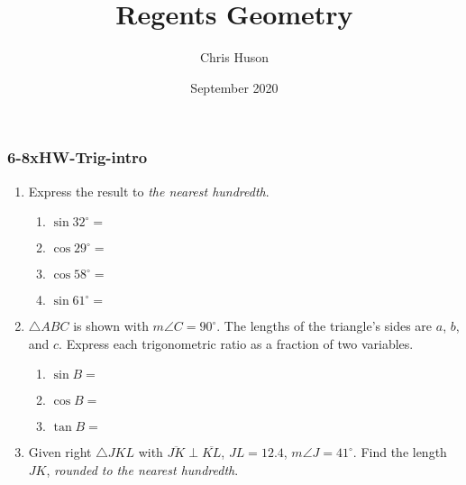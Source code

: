 \documentclass[12pt, twoside]{article}
\title{Regents Geometry}
\author{Chris Huson}
\date{September 2020}
\begin{document}
\subsubsection*{6-8xHW-Trig-intro}
\begin{enumerate}
\item Express the result to \emph{the nearest hundredth}.  \vspace{0.5cm}
    \begin{multicols}{2}
      \begin{enumerate}
        \item $\sin 32^\circ = $ \vspace{0.5cm}
        \item $\cos 29^\circ =$
        \item $\cos 58^\circ = $ \vspace{0.5cm}
        \item $\sin 61^\circ =$
      \end{enumerate}
    \end{multicols}

\item $\triangle ABC$ is shown with $m\angle C=90^\circ$. The lengths of the triangle's sides are $a$, $b$, and $c$. Express each trigonometric ratio as a fraction of two variables. \vspace{1cm}
  \begin{multicols}{2}

        \begin{enumerate}
        \item $\sin B =$ \vspace{0.75cm}
        \item $\cos B =$ \vspace{0.75cm}
        \item $\tan B =$ \vspace{0.75cm}
      \end{enumerate}
  \end{multicols}

  
\item Given right $\triangle JKL$ with $\overline{JK} \perp \overline{KL}$, $JL=12.4$, $m\angle J=41^\circ$. Find the length $JK$, \emph{rounded to the nearest hundredth}.
    \begin{center}
    \end{center}


\end{enumerate}
\end{document}
